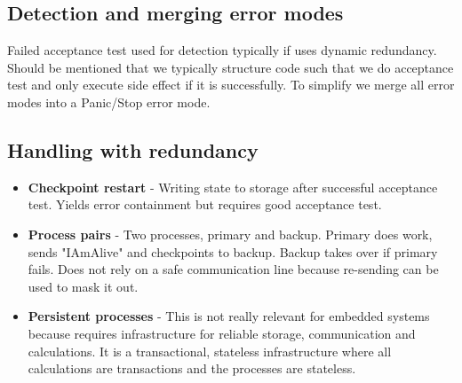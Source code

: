\subsection{Detection and merging error modes}
Failed acceptance test used for detection typically if uses dynamic redundancy. Should be mentioned that we typically structure code such that we do acceptance test and only execute side effect if it is successfully. To simplify we merge all error modes into a Panic/Stop error mode.

\subsection{Handling with redundancy}
\begin{itemize}
\item \textbf{Checkpoint restart} - Writing state to storage after successful acceptance test. Yields error containment but requires good acceptance test.
\item \textbf{Process pairs} - Two processes, primary and backup. Primary does work, sends "IAmAlive" and checkpoints to backup. Backup takes over if primary fails. Does not rely on a safe communication line because re-sending can be used to mask it out.
\item \textbf{Persistent processes} - This is not really relevant for embedded systems because requires infrastructure for reliable storage, communication and calculations. It is a transactional, stateless infrastructure where all calculations are transactions and the processes are stateless.   
\end{itemize}



 
